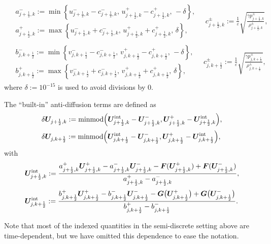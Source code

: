 \documentclass[A4paper,12pt,twoside]{article}
\numberwithin{equation}{section}
\numberwithin{figure}{section}
\numberwithin{table}{section}
\newcommand{\kph}{{k+\frac{1}{2}}}
\newcommand{\jph}{{j+\frac{1}{2}}}
\newcommand{\ve}{\varepsilon}
\newcommand{\lore}[1]{{\leavevmode\color{red} #1}}
\begin{document}
\begin{equation}
\begin{aligned}
\begin{aligned}
&a^-_{\jph,k}:=\min\left\{u^-_{\jph,k}-c^-_{\jph,k},\,u^+_{\jph,k}-c^+_{\jph,k},\,-\delta\right\},\\
&a^+_{\jph,k}:=\max\left\{u^-_{\jph,k}+c^-_{\jph,k},\,u^+_{\jph,k}+c^+_{\jph,k},\,\delta\right\},
\end{aligned}\quad c^\pm_{\jph,k}:=\frac{1}{\ve}\sqrt{\frac{\gamma p^\pm_{\jph,k}}{\rho^\pm_{\jph,k}}},\\[1.5ex]
\begin{aligned}
&b^-_{j,\kph}:=\min\left\{v^-_{j,\kph}-c^-_{j,\kph},\,v^+_{j,\kph}-c^+_{j,\kph},\,-\delta\right\},\\
&b^+_{j,\kph}:=\max\left\{v^-_{j,\kph}+c^-_{j,\kph},\,v^+_{j,\kph}+c^+_{j,\kph},\,\delta\right\},
\end{aligned}\quad c^\pm_{j,\kph}:=\frac{1}{\ve}\sqrt{\frac{\gamma p^\pm_{j,\kph}}{\rho^\pm_{j,\kph}}},
\end{aligned}
\label{3.42}
\end{equation}
where $\delta:=10^{-15}$ is used to avoid divisions by $0$.

The ``built-in'' anti-diffusion terms are \lore{defined as}
\begin{equation}
\begin{aligned}
&\delta\bm U_{\jph,k}:={\rm minmod}\Big(\bm U_{\jph,k}^{\rm int}-\bm U^-_{\jph,k},\bm U^+_{\jph,k}-\bm U_{\jph,k}^{\rm int}\Big),\\[0.5ex]
&\delta\bm U_{j,\kph}:={\rm minmod}\Big(\bm U_{j,\kph}^{\rm int}-\bm U^-_{j,\kph},\bm U^+_{j,\kph}-\bm U_{j,\kph}^{\rm int}\Big),
\end{aligned}
\label{3.43}
\end{equation}
with 
\begin{equation}
\begin{aligned}
&\bm U_{\jph,k}^{\rm int}:=\frac{a^+_{\jph,k}\bm U^+_{\jph,k}-a^-_{\jph,k}\bm U^-_{\jph,k}
-\bm F(\bm U^+_{\jph,k})+\bm F(\bm U^-_{\jph,k})}{a^+_{\jph,k}-a^-_{\jph,k}},\\[0.5ex]
&\bm U_{j,\kph}^{\rm int}:=\frac{b^+_{j,\kph}\bm U^+_{j,\kph}-b^-_{j,\kph}\bm U^-_{j,\kph}
-\bm G\big(\bm U^+_{j,\kph}\big)+\bm G\big(\bm U^-_{j,\kph}\big)}{b^+_{j,\kph}-b^-_{j,\kph}}.
\end{aligned}
\label{3.44}
\end{equation}

Note that most of the indexed quantities in the semi-discrete setting above are time-dependent, but we have omitted this dependence \lore{to ease the notation.} %
\end{document}
